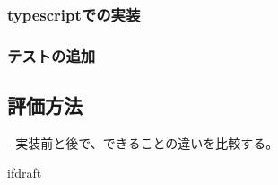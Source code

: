 \documentclass{jsarticle}
\begin{document}
    \subsubsection{typescriptでの実装}

    \subsubsection{テストの追加}


    \subsection{評価方法}
    - 実装前と後で、できることの違いを比較する。
















    \expandafter\ifx\csname ifdraft\endcsname\relax
\end{document}
